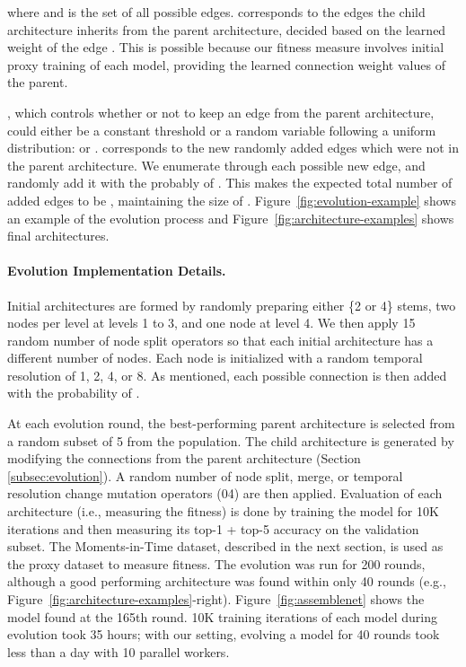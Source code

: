 \documentclass{article} \usepackage{iclr2020_conference,times}
\begin{document}
where  and  is the set of all possible edges.
 corresponds to the edges the child architecture inherits from the parent architecture, decided based on the learned weight of the edge . This is possible because our fitness measure involves initial proxy training of each model, providing the learned connection weight values  of the parent.



, which controls whether or not to keep an edge from the parent architecture, could either be a constant threshold or a random variable following a uniform distribution:  or .  corresponds to the new randomly added edges which were not in the parent architecture. We enumerate through each possible new edge, and randomly add it with the probably of . This makes the expected total number of added edges to be , maintaining the size of .
Figure~\ref{fig:evolution-example} shows an example of the evolution process and Figure~\ref{fig:architecture-examples} shows final architectures.
















\vspace{-7pt}
\paragraph{Evolution Implementation Details.}

Initial architectures are formed by randomly preparing either \{2 or 4\} stems, two nodes per level at levels 1 to 3, and one node at level 4.
We then apply 15 random number of node split operators so that each initial architecture has a different number of nodes. 
Each node is initialized with a random temporal resolution of 1, 2, 4, or 8. As mentioned, each possible connection is then added with the probability of .

\vspace{-3pt}
At each evolution round, the best-performing parent architecture is selected from a random subset of 5 from the population. The child architecture is generated by modifying the connections from the parent architecture (Section \ref{subsec:evolution}). A random number of node split, merge, or temporal resolution change mutation operators (04) are then applied. Evaluation of each architecture (i.e., measuring the fitness) is done by training the model for 10K iterations and then measuring its top-1 + top-5 accuracy on the validation subset. The Moments-in-Time dataset, described in the next section, is used as the proxy dataset to measure fitness. 
The evolution was run for 200 rounds, although a good performing architecture was found within only 40 rounds (e.g., Figure~\ref{fig:architecture-examples}-right). Figure~\ref{fig:assemblenet} shows the model found at the 165th round. 10K training iterations of each model during evolution took 35 hours; with our setting, evolving a model for 40 rounds took less than a day with 10 parallel workers.
\end{document}
